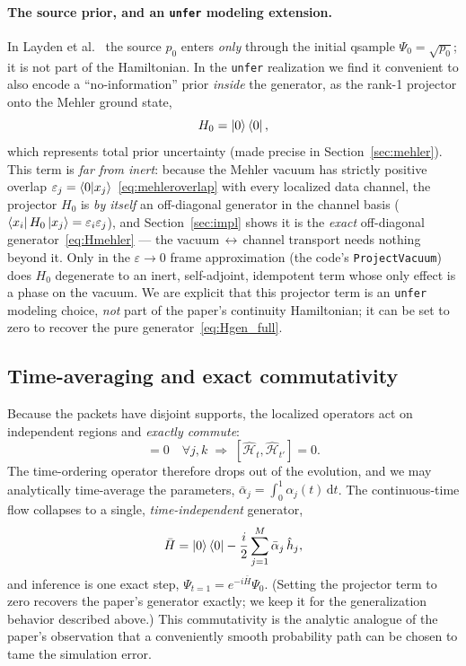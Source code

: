 \documentclass[11pt, a4paper]{article}
\newcommand{\Hgen}{\hat{\mathcal{H}}}
\begin{document}
\paragraph{The source prior, and an \texttt{unfer} modeling extension.}
In Layden et al.~\cite{Layden2025} the source $p_0$ enters \emph{only} through
the initial qsample $\Psi_0=\sqrt{p_0}$; it is not part of the Hamiltonian. In
the \texttt{unfer} realization we find it convenient to also encode a
``no-information'' prior \emph{inside} the generator, as the rank-1 projector
onto the Mehler ground state,
\begin{equation}
  H_0=\ket{0}\bra{0},
\end{equation}
which represents total prior uncertainty (made precise in
Section~\ref{sec:mehler}). This term is \emph{far from inert}: because the
Mehler vacuum has strictly positive overlap
$\varepsilon_j=\braket{0|x_j}$~\eqref{eq:mehleroverlap} with every localized
data channel, the projector $H_0$ is \emph{by itself} an off-diagonal
generator in the channel basis
($\bra{x_i}H_0\ket{x_j}=\varepsilon_i\varepsilon_j$), and
Section~\ref{sec:impl} shows it is the \emph{exact} off-diagonal
generator~\eqref{eq:Hmehler} --- the vacuum$\,\leftrightarrow\,$channel
transport needs nothing beyond it. Only in the $\varepsilon\to0$ frame
approximation (the code's \texttt{ProjectVacuum}) does $H_0$ degenerate to
an inert, self-adjoint, idempotent term whose only effect is a phase on the
vacuum. We are explicit that this projector term is an \texttt{unfer}
modeling choice, \emph{not} part of the paper's continuity Hamiltonian; it
can be set to zero to recover the pure generator~\eqref{eq:Hgen_full}.

\subsection{Time-averaging and exact commutativity}

Because the packets have disjoint supports, the localized operators act on
independent regions and \emph{exactly commute}:
\begin{equation}
  [\hat h_j,\hat h_k]=0\quad\forall j,k
  \;\Longrightarrow\;[\Hgen_t,\Hgen_{t'}]=0 .
\end{equation}
The time-ordering operator therefore drops out of the evolution, and we may
analytically time-average the parameters, $\bar\alpha_j=\int_0^1\alpha_j(t)\,
\mathrm{d}t$. The continuous-time flow collapses to a single,
\emph{time-independent} generator,
\begin{equation}
  \bar H=\ket{0}\bra{0}-\frac{i}{2}\sum_{j=1}^M\bar\alpha_j\,\hat h_j ,
  \label{eq:Hbar}
\end{equation}
and inference is one exact step, $\Psi_{t=1}=e^{-i\bar H}\Psi_0$. (Setting the
projector term to zero recovers the paper's generator exactly; we keep it for
the generalization behavior described above.) This commutativity is the
analytic analogue of the paper's observation that a conveniently smooth
probability path can be chosen to tame the simulation error.
\end{document}
